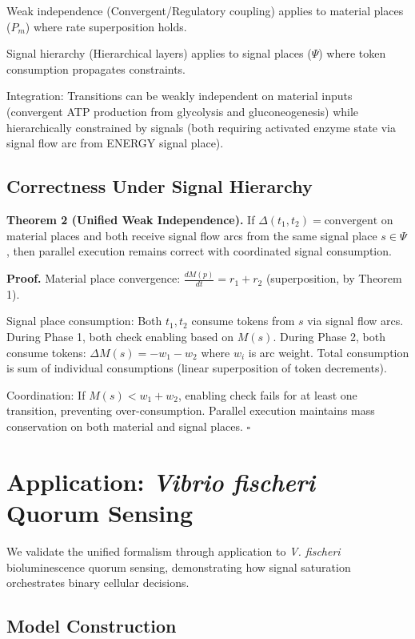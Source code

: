 \documentclass[twocolumn,11pt]{article}
\newcommand{\DepType}[2]{\ensuremath{\Delta(#1,#2)}}
\begin{document}
Weak independence (Convergent/Regulatory coupling) applies to material places ($P_m$) where rate superposition holds.

Signal hierarchy (Hierarchical layers) applies to signal places ($\Psi$) where token consumption propagates constraints.

Integration: Transitions can be weakly independent on material inputs (convergent ATP production from glycolysis and gluconeogenesis) while hierarchically constrained by signals (both requiring activated enzyme state via signal flow arc from ENERGY signal place).

\subsection{Correctness Under Signal Hierarchy}

\textbf{Theorem 2 (Unified Weak Independence).} If $\DepType{t_1}{t_2} = \text{convergent}$ on material places and both receive signal flow arcs from the same signal place $s \in \Psi$, then parallel execution remains correct with coordinated signal consumption.

\textbf{Proof.} Material place convergence: $\frac{dM(p)}{dt} = r_1 + r_2$ (superposition, by Theorem 1).

Signal place consumption: Both $t_1, t_2$ consume tokens from $s$ via signal flow arcs. During Phase 1, both check enabling based on $M(s)$. During Phase 2, both consume tokens: $\Delta M(s) = -w_1 - w_2$ where $w_i$ is arc weight. Total consumption is sum of individual consumptions (linear superposition of token decrements).

Coordination: If $M(s) < w_1 + w_2$, enabling check fails for at least one transition, preventing over-consumption. Parallel execution maintains mass conservation on both material and signal places. $\square$

\section{Application: \textit{Vibrio fischeri} Quorum Sensing}

We validate the unified formalism through application to \textit{V. fischeri} bioluminescence quorum sensing, demonstrating how signal saturation orchestrates binary cellular decisions.

\subsection{Model Construction}
\end{document}
